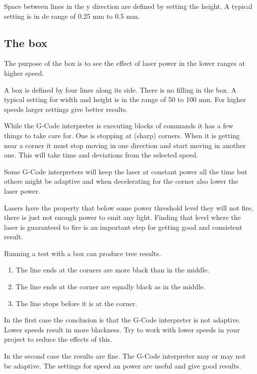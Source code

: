 Space between lines in the y direction are defined by setting the height. A typical setting is in de range of 0.25 mm to 0.5 mm.

\subsection{The box}
The purpose of the box is to see the effect of laser power in the lower ranges
at higher speed.

A box is defined by four lines along its side. There is no filling in the box. A typical setting for width and height
is in the range of 50 to 100 mm. For higher speeds larger settings give better results.

While the G-Code interpreter is executing blocks of commands it has a few things to take care for. One is stopping at
(sharp) corners. When it is getting near a corner it must stop moving in one direction and start moving in another one.
This will take time and deviations from the selected speed.

Some G-Code interpreters will keep the laser at constant power all the time but others might be adaptive and when
decelerating for the corner also lower the laser power.

Lasers have the property that below some power threshold level they will not fire,
there is just not enough power to emit any light. Finding that level where the laser is guaranteed to fire is an
important step for getting good and consistent result.

Running a test with a box can produce tree results.
\begin{enumerate}
    \item The line ends at the corners are more black than in the middle.
    \item The line ends at the corner are equally black as in the middle.
    \item The line stops before it is at the corner.
\end{enumerate}

In the first case the conclusion is that the G-Code interpreter is not adaptive. Lower speeds result in more blackness.
Try to work with lower speeds in your project to reduce the effects of this.

In the second case the results are fine. The G-Code interpreter may or may not be adaptive. The settings for speed an
power are useful and give good results.

